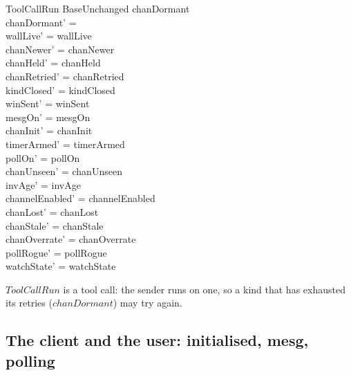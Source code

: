 \documentclass[a4paper,10pt,fleqn]{article}
\begin{document}
\begin{schema}{ToolCallRun}
  BaseUnchanged
  \where
  chanDormant \neq \emptyset \\
  chanDormant' = \emptyset \\
  wallLive' = wallLive \\
  chanNewer' = chanNewer \\
  chanHeld' = chanHeld \\
  chanRetried' = chanRetried \\
  kindClosed' = kindClosed \\
  winSent' = winSent \\
  mesgOn' = mesgOn \\
  chanInit' = chanInit \\
  timerArmed' = timerArmed \\
  pollOn' = pollOn \\
  chanUnseen' = chanUnseen \\
  invAge' = invAge \\
  channelEnabled' = channelEnabled \\
  chanLost' = chanLost \\
  chanStale' = chanStale \\
  chanOverrate' = chanOverrate \\
  pollRogue' = pollRogue \\
  watchState' = watchState
\end{schema}

$ToolCallRun$ is a tool call: the sender runs on one, so a kind that has
exhausted its retries ($chanDormant$) may try again.

\subsection{The client and the user: initialised, mesg, polling}
\end{document}
